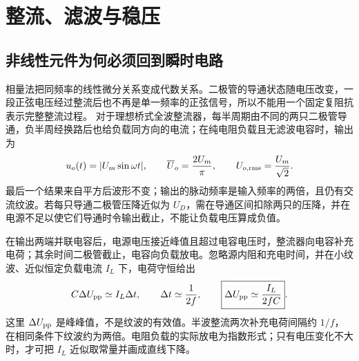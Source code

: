 \section{整流、滤波与稳压}

\subsection{非线性元件为何必须回到瞬时电路}
相量法把同频率的线性微分关系变成代数关系。二极管的导通状态随电压改变，一段正弦电压经过整流后也不再是单一频率的正弦信号，所以不能用一个固定复阻抗表示完整整流过程。
对于理想桥式全波整流器，每半周期由不同的两只二极管导通，负半周经换路后也给负载同方向的电流；在纯电阻负载且无滤波电容时，输出为
\[
 u_o(t)=|U_m\sin\omega t|,\qquad
 \overline U_o=\frac{2U_m}{\pi},\qquad U_{o,\rm rms}=\frac{U_m}{\sqrt2}.
\]
最后一个结果来自平方后波形不变；输出的脉动频率是输入频率的两倍，且仍有交流纹波。若每只导通二极管压降近似为 $U_D$，需在导通区间扣除两只的压降，并在电源不足以使它们导通时令输出截止，不能让负载电压算成负值。

在输出两端并联电容后，电源电压接近峰值且超过电容电压时，整流器向电容补充电荷；其余时间二极管截止，电容向负载放电。忽略源内阻和充电时间，并在小纹波、近似恒定负载电流 $I_L$ 下，电荷守恒给出
\[
 C\Delta U_{\rm pp}\simeq I_L\Delta t,\qquad
 \Delta t\simeq\frac1{2f},\qquad
 \boxed{\Delta U_{\rm pp}\simeq\frac{I_L}{2fC}}.
\]
这里 $\Delta U_{\rm pp}$ 是峰峰值，不是纹波的有效值。半波整流两次补充电荷间隔约 $1/f$，在相同条件下纹波约为两倍。电阻负载的实际放电为指数形式；只有电压变化不大时，才可把 $I_L$ 近似取常量并画成直线下降。

